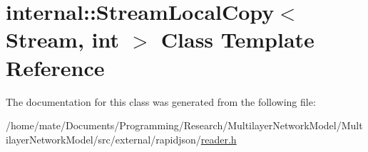 \hypertarget{classinternal_1_1StreamLocalCopy}{}\section{internal\+:\+:Stream\+Local\+Copy$<$ Stream, int $>$ Class Template Reference}
\label{classinternal_1_1StreamLocalCopy}


The documentation for this class was generated from the following file\+:\begin{DoxyCompactItemize}
\item 
/home/mate/\+Documents/\+Programming/\+Research/\+Multilayer\+Network\+Model/\+Multilayer\+Network\+Model/src/external/rapidjson/\hyperlink{reader_8h}{reader.\+h}\end{DoxyCompactItemize}

